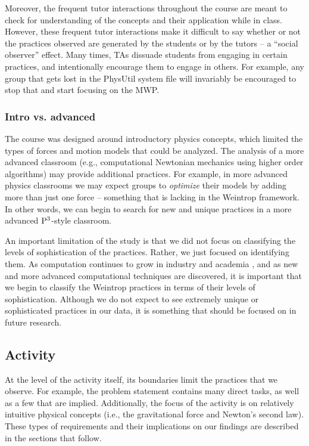 \documentclass{msuphddissertation}
\begin{document}
\begin{doublespace}
Moreover, the frequent tutor interactions throughout the course are meant to check for understanding of the concepts and their application while in class.  However, these frequent tutor interactions make it difficult to say whether or not the practices observed are generated by the students or by the tutors -- a ``social observer'' effect.  Many times, TAs dissuade students from engaging in certain practices, and intentionally encourage them to engage in others.  For example, any group that gets lost in the PhysUtil system file will invariably be encouraged to stop that and start focusing on the MWP.

\subsubsection{Intro vs. advanced}\label{CH6:IntroVsAdvanced}

The course was designed around introductory physics concepts, which limited the types of forces and motion models that could be analyzed.  The analysis of a more advanced classroom (e.g., computational Newtonian mechanics using higher order algorithms) may provide additional practices.  For example, in more advanced physics classrooms we may expect groups to \textit{optimize} their models by adding more than just one force -- something that is lacking in the Weintrop framework.  In other words, we can begin to search for new and unique practices in a more advanced ${\rm P}^{3}$-style classroom.

An important limitation of the study is that we did not focus on classifying the levels of sophistication of the practices.  Rather, we just focused on identifying them.  As computation continues to grow in industry and academia \cite{Chonacky2008}, and as new and more advanced computational techniques are discovered, it is important that we begin to classify the Weintrop practices in terms of their levels of sophistication.  Although we do not expect to see extremely unique or sophisticated practices in our data, it is something that should be focused on in future research.

\subsection{Activity}\label{CH6:Activity}

At the level of the activity itself, its boundaries limit the practices that we observe.  For example, the problem statement contains many direct tasks, as well as a few that are implied.  Additionally, the focus of the activity is on relatively intuitive physical concepts (i.e., the gravitational force and Newton's second law).  These types of requirements and their implications on our findings are described in the sections that follow.


\end{doublespace}
\end{document}
